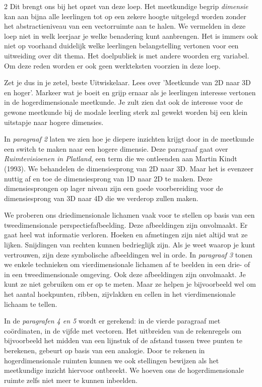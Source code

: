 \begin{multicols}{2}
Dit brengt ons bij het opzet van deze loep. Het meetkundige begrip \emph{dimensie} kan aan bijna alle leerlingen tot op een zekere hoogte uitgelegd worden zonder het abstractieniveau van een vectorruimte aan te halen. We vermelden in deze loep niet in welk leerjaar je welke benadering kunt aanbrengen. Het is immers ook niet op voorhand duidelijk welke leerlingen belangstelling vertonen voor een uitweiding over dit thema. Het doelpubliek is met andere woorden erg variabel. Om deze reden worden er ook geen werkteksten voorzien in deze loep.   

Zet je dus in je zetel, beste Uitwiskelaar. Lees over 'Meetkunde van 2D naar 3D en hoger'. Markeer wat je boeit en grijp ernaar als je leerlingen interesse vertonen in de hogerdimensionale meetkunde. Je zult zien dat ook de interesse voor de gewone meetkunde bij de modale leerling sterk zal gewekt worden bij een klein uitstapje naar hogere dimensies.


In \emph{paragraaf 2} laten we zien hoe je diepere inzichten krijgt door in de meetkunde een switch te maken naar een hogere dimensie. Deze paragraaf gaat over \emph{Ruimtevisioenen in Platland}, een term die we ontleenden aan Martin Kindt (1993). We behandelen de dimensiesprong van 2D naar 3D. Maar het is evenzeer nuttig af en toe de dimensiesprong van 1D naar 2D te maken. Deze dimensiesprongen op lager niveau zijn een goede voorbereiding voor de dimensiesprong van 3D naar 4D die we verderop zullen maken.

We proberen ons driedimensionale lichamen vaak voor te stellen op basis van een tweedimensionale perspectiefafbeelding. Deze afbeeldingen zijn onvolmaakt. Er gaat heel wat informatie verloren. Hoeken en afmetingen zijn niet altijd wat ze lijken. Snijdingen van rechten kunnen bedrieglijk zijn. Als je weet waarop je kunt vertrouwen, zijn deze symbolische afbeeldingen wel in orde. 
In \emph{paragraaf 3} tonen we enkele technieken om vierdimensionale lichamen af te beelden in een drie- of in een tweedimensionale omgeving. Ook deze afbeeldingen zijn onvolmaakt. Je kunt ze niet gebruiken om er op te meten. Maar ze helpen je bijvoorbeeld wel om het aantal hoekpunten, ribben, zijvlakken en cellen in het vierdimensionale lichaam te tellen.

In de \emph{paragrafen 4 en 5} wordt er gerekend: in de vierde paragraaf met coördinaten, in de vijfde met vectoren. Het uitbreiden van de rekenregels om bijvoorbeeld het midden van een lijnstuk of de afstand tussen twee punten te berekenen, gebeurt op basis van een analogie. Door te rekenen in hogerdimensionale ruimten kunnen we ook stellingen bewijzen als het meetkundige inzicht hiervoor ontbreekt. We hoeven ons de hogerdimensionale ruimte zelfs niet meer te kunnen inbeelden.


\end{multicols}
